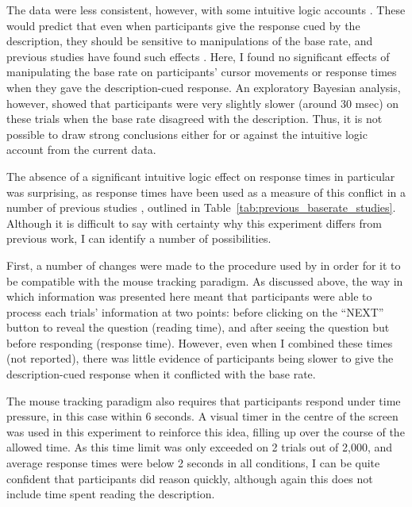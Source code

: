 The data were less consistent, however, with some intuitive logic accounts
\citep[i.e.][]{DeNeys2012,DeNeys2014a,Handley2015}.
These would predict that
even when participants give the response cued by the description,
they should be sensitive to manipulations of the base rate,
and previous studies have found such effects
\citep[i.e.][]{DeNeys2008,Pennycook2012a,Pennycook2014}.
Here, I found no significant effects of manipulating the base rate
on participants' cursor movements or response times
when they gave the description-cued response.
An exploratory Bayesian analysis, however,
showed that participants were very slightly slower (around 30 msec)
on these trials when the base rate disagreed with the description.
Thus, it is not possible to draw strong conclusions
either for or against the intuitive logic account
from the current data.

The absence of a significant intuitive logic effect
on response times in particular was surprising,
as response times have been used as a measure of this conflict
in a number of previous studies \citep[i.e.][]{DeNeys2008,Pennycook2012a},
outlined in Table~\ref{tab:previous_baserate_studies}.
Although it is difficult to say with certainty
why this experiment differs from previous work,
I can identify a number of possibilities.

First, a number of changes were made to 
the procedure used by \citet{DeNeys2008a}
in order for it to be compatible with the mouse tracking paradigm.
As discussed above, the way in which information
was presented here meant that participants were able to
process each trials' information at two points:
before clicking on the ``NEXT'' button to reveal the question (reading time),
and after seeing the question but before responding (response time).
However, even when I combined these times (not reported),
there was little evidence of participants being slower
to give the description-cued response when it conflicted with the base rate.

The mouse tracking paradigm also requires that
participants respond under time pressure,
in this case within 6 seconds.
A visual timer in the centre of the screen
was used in this experiment to reinforce this idea,
filling up over the course of the allowed time.
As this time limit was only exceeded on 2 trials out of 2,000,
and average response times were below 2 seconds in all conditions,
I can be quite confident that participants did reason quickly,
although again this does not include
time spent reading the description.

